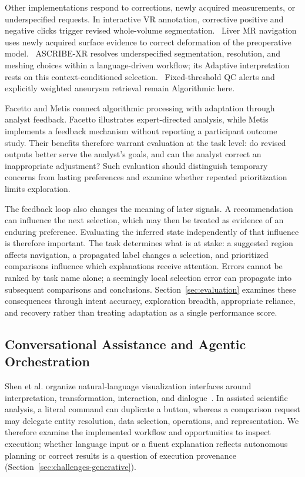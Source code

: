 Other implementations respond to corrections, newly acquired measurements, or underspecified requests. In interactive VR annotation, corrective positive and negative clicks trigger revised whole-volume segmentation.~\cite{ExpandedE24} Liver MR navigation uses newly acquired surface evidence to correct deformation of the preoperative model.~\cite{ExpandedE15} ASCRIBE-XR resolves underspecified segmentation, resolution, and meshing choices within a language-driven workflow; its Adaptive interpretation rests on this context-conditioned selection.~\cite{ExpandedE28} Fixed-threshold QC alerts and explicitly weighted aneurysm retrieval remain Algorithmic here.~\cite{ExpandedE48,ExpandedE46}

Facetto and Metis connect algorithmic processing with adaptation through analyst feedback. Facetto illustrates expert-directed analysis, while Metis implements a feedback mechanism without reporting a participant outcome study. Their benefits therefore warrant evaluation at the task level: do revised outputs better serve the analyst’s goals, and can the analyst correct an inappropriate adjustment? Such evaluation should distinguish temporary concerns from lasting preferences and examine whether repeated prioritization limits exploration.

The feedback loop also changes the meaning of later signals. A recommendation can influence the next selection, which may then be treated as evidence of an enduring preference. Evaluating the inferred state independently of that influence is therefore important. The task determines what is at stake: a suggested region affects navigation, a propagated label changes a selection, and prioritized comparisons influence which explanations receive attention. Errors cannot be ranked by task name alone; a seemingly local selection error can propagate into subsequent comparisons and conclusions. Section~\ref{sec:evaluation} examines these consequences through intent accuracy, exploration breadth, appropriate reliance, and recovery rather than treating adaptation as a single performance score.

\subsection{Conversational Assistance and Agentic Orchestration}
\label{sec:assistance-conversational}

Shen et al. organize natural-language visualization interfaces around interpretation, transformation, interaction, and dialogue~\cite{Shen2023NaturalLanguageSurvey}. In assisted scientific analysis, a literal command can duplicate a button, whereas a comparison request may delegate entity resolution, data selection, operations, and representation. We therefore examine the implemented workflow and opportunities to inspect execution; whether language input or a fluent explanation reflects autonomous planning or correct results is a question of execution provenance (Section~\ref{sec:challenges-generative}).

